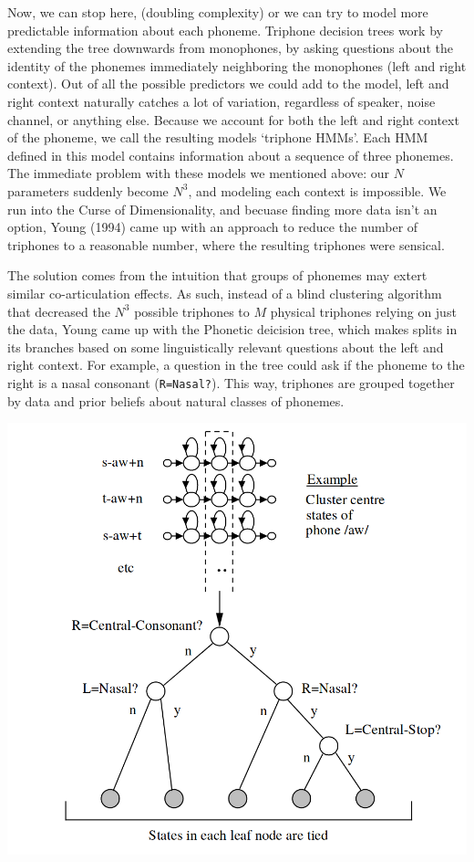 \documentclass[10pt,a4paper]{article}
\begin{document}

Now, we can stop here, (doubling complexity) or we can try to model more predictable information about each phoneme. Triphone decision trees work by extending the tree downwards from monophones, by asking questions about the identity of the phonemes immediately neighboring the monophones (left and right context). Out of all the possible predictors we could add to the model, left and right context naturally catches a lot of variation, regardless of speaker, noise channel, or anything else. Because we account for both the left and right context of the phoneme, we call the resulting models `triphone HMMs'. Each HMM defined in this model contains information about a sequence of three phonemes. The immediate problem with these models we mentioned above: our $N$ parameters suddenly become $N^3$, and modeling each context is impossible. We run into the Curse of Dimensionality, and becuase finding more data isn't an option, Young (1994) came up with an approach to reduce the number of triphones to a reasonable number, where the resulting triphones were sensical.

The solution comes from the intuition that groups of phonemes may extert similar co-articulation effects. As such, instead of a blind clustering algorithm that decreased the $N^3$ possible triphones to $M$ physical triphones relying on just the data, Young came up with the Phonetic deicision tree, which makes splits in its branches based on some linguistically relevant questions about the left and right context. For example, a question in the tree could ask if the phoneme to the right is a nasal consonant (\texttt{R=Nasal?}). This way, triphones are grouped together by data and prior beliefs about natural classes of phonemes.

\begin{center}
  \includegraphics[width=.5\textwidth,keepaspectratio]{figs/htk-tree.png}
\end{center}
\end{document}
